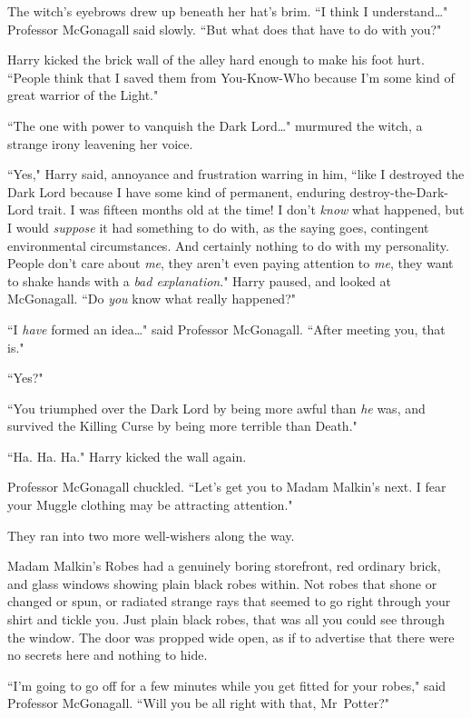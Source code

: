 The witch's eyebrows drew up beneath her hat's brim. ``I think I understand{\ldots}" Professor McGonagall said slowly. ``But what does that have to do with you?"

Harry kicked the brick wall of the alley hard enough to make his foot hurt. ``People think that I saved them from You-Know-Who because I'm some kind of great warrior of the Light."

``The one with power to vanquish the Dark Lord{\ldots}" murmured the witch, a strange irony leavening her voice.

``Yes," Harry said, annoyance and frustration warring in him, ``like I destroyed the Dark Lord because I have some kind of permanent, enduring destroy-the-Dark-Lord trait. I was fifteen months old at the time! I don't \emph{know} what happened, but I would \emph{suppose} it had something to do with, as the saying goes, contingent environmental circumstances. And certainly nothing to do with my personality. People don't care about \emph{me}, they aren't even paying attention to \emph{me}, they want to shake hands with a \emph{bad explanation}." Harry paused, and looked at McGonagall. ``Do \emph{you} know what really happened?"

``I \emph{have} formed an idea{\ldots}" said Professor McGonagall. ``After meeting you, that is."

``Yes?"

``You triumphed over the Dark Lord by being more awful than \emph{he} was, and survived the Killing Curse by being more terrible than Death."

``Ha. Ha. Ha." Harry kicked the wall again.

Professor McGonagall chuckled. ``Let's get you to Madam Malkin's next. I fear your Muggle clothing may be attracting attention."

They ran into two more well-wishers along the way.

Madam Malkin's Robes had a genuinely boring storefront, red ordinary brick, and glass windows showing plain black robes within. Not robes that shone or changed or spun, or radiated strange rays that seemed to go right through your shirt and tickle you. Just plain black robes, that was all you could see through the window. The door was propped wide open, as if to advertise that there were no secrets here and nothing to hide.

``I'm going to go off for a few minutes while you get fitted for your robes," said Professor McGonagall. ``Will you be all right with that, Mr~Potter?"


